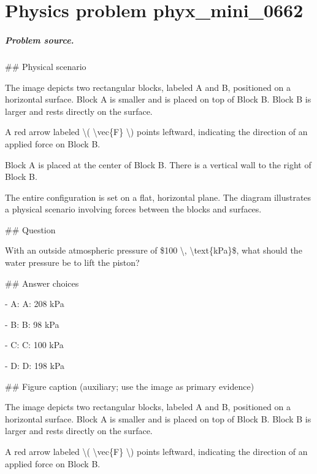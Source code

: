 
\chapter{Physics problem phyx\_mini\_0662}
\label{ch:PhyXMiniProblems_problem_phyx_mini_0662}

\paragraph{Problem source.}
\#\# Physical scenario

The image depicts two rectangular blocks, labeled A and B, positioned on a horizontal surface. Block A is smaller and is placed on top of Block B. Block B is larger and rests directly on the surface. 

A red arrow labeled \textbackslash{}( \textbackslash{}vec\{F\} \textbackslash{}) points leftward, indicating the direction of an applied force on Block B.

Block A is placed at the center of Block B. There is a vertical wall to the right of Block B. 

The entire configuration is set on a flat, horizontal plane. The diagram illustrates a physical scenario involving forces between the blocks and surfaces.

\#\# Question

With an outside atmospheric pressure of \$100 \textbackslash{}, \textbackslash{}text\{kPa\}\$, what should the water pressure be to lift the piston?

\#\# Answer choices

- A: A: 208 kPa

- B: B: 98 kPa

- C: C: 100 kPa

- D: D: 198 kPa

\#\# Figure caption (auxiliary; use the image as primary evidence)

The image depicts two rectangular blocks, labeled A and B, positioned on a horizontal surface. Block A is smaller and is placed on top of Block B. Block B is larger and rests directly on the surface. 

A red arrow labeled \textbackslash{}( \textbackslash{}vec\{F\} \textbackslash{}) points leftward, indicating the direction of an applied force on Block B.

